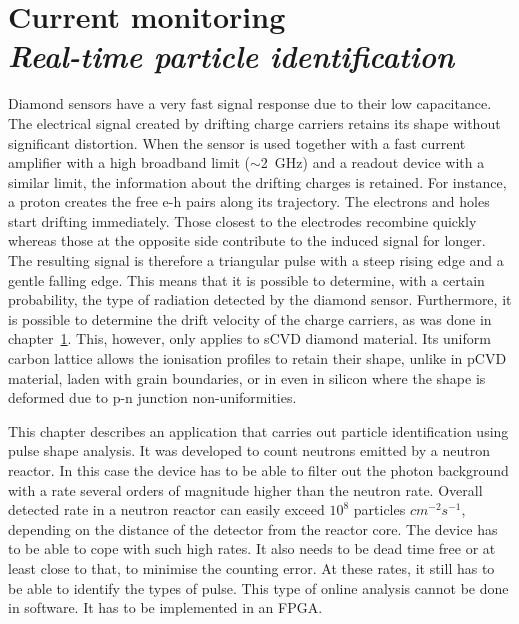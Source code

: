 \documentclass[12pt]{packages/mytustyle}  %
\newcommand\Chapter[2]{\chapter
  [#1\hfil\hbox{}\protect\linebreak{\itshape#2}]%
  {#1\\[2ex]\Large\itshape#2}%
}
\begin{document}
\baselineskip=15pt

\tableofcontents

\Chapter{Current monitoring}{Real-time particle identification}

Diamond sensors have a very fast signal response due to their low capacitance. The electrical signal created by drifting charge carriers retains its shape without significant distortion. When the sensor is used together with a fast current amplifier with a high broadband limit ($\sim$2~GHz) and a readout device with a similar limit, the information about the drifting charges is retained. For instance, a proton creates the free e-h pairs along its trajectory. The electrons and holes start drifting immediately. Those closest to the electrodes recombine quickly whereas those at the opposite side contribute to the induced signal for longer. The resulting signal is therefore a triangular pulse with a steep rising edge and a gentle falling edge. This means that it is possible to determine, with a certain probability, the type of radiation detected by the diamond sensor. Furthermore, it is possible to determine the drift velocity of the charge carriers, as was done in chapter~\ref{}. This, however, only applies to sCVD diamond material. Its uniform carbon lattice allows the ionisation profiles to retain their shape, unlike in pCVD material, laden with grain boundaries, or in even in silicon where the shape is deformed due to p-n junction non-uniformities.

This chapter describes an application that carries out particle identification using pulse shape analysis. It was developed to count neutrons emitted by a neutron reactor. In this case the device has to be able to filter out the photon background with a rate several orders of magnitude higher than the neutron rate. Overall detected rate in a neutron reactor can easily exceed $10^8$ particles $cm^{-2}s^{-1}$, depending on the distance of the detector from the reactor core. The device has to be able to cope with such high rates. It also needs to be dead time free or at least close to that, to minimise the counting error. At these rates, it still has to be able to identify the types of pulse. This type of online analysis cannot be done in software. It has to be implemented in an FPGA.
\end{document}
